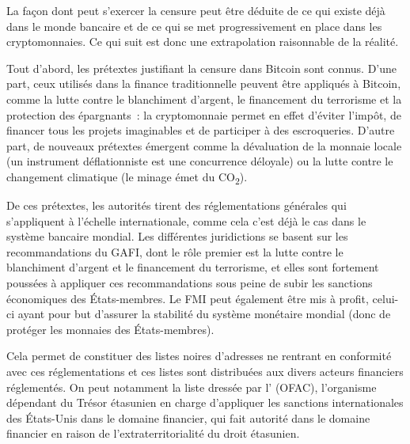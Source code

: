 La façon dont peut s'exercer la censure peut être déduite de ce qui existe déjà dans le monde bancaire et de ce qui se met progressivement en place dans les cryptomonnaies. Ce qui suit est donc une extrapolation raisonnable de la réalité.

Tout d'abord, les prétextes justifiant la censure dans Bitcoin sont connus. D'une part, ceux utilisés dans la finance traditionnelle peuvent être appliqués à Bitcoin, comme la lutte contre le blanchiment d'argent, le financement du terrorisme et la protection des épargnants~: la cryptomonnaie permet en effet d'éviter l'impôt, de financer tous les projets imaginables et de participer à des escroqueries. D'autre part, de nouveaux prétextes émergent comme la dévaluation de la monnaie locale (un instrument déflationniste est une concurrence déloyale) ou la lutte contre le changement climatique (le minage émet du CO\textsubscript{2}).

De ces prétextes, les autorités tirent des réglementations générales qui s'appliquent à l'échelle internationale, comme cela c'est déjà le cas dans le système bancaire mondial. Les différentes juridictions se basent sur les recommandations du GAFI, dont le rôle premier est la lutte contre le blanchiment d'argent et le financement du terrorisme, et elles sont fortement poussées à appliquer ces recommandations sous peine de subir les sanctions économiques des États-membres. Le FMI peut également être mis à profit, celui-ci ayant pour but d'assurer la stabilité du système monétaire mondial (donc de protéger les monnaies des États-membres).

Cela permet de constituer des listes noires d'adresses ne rentrant en conformité avec ces réglementations et ces listes sont distribuées aux divers acteurs financiers réglementés. On peut notamment la liste dressée par l' (OFAC), l'organisme dépendant du Trésor étasunien en charge d'appliquer les sanctions internationales des États-Unis dans le domaine financier, qui fait autorité dans le domaine financier en raison de l'extraterritorialité du droit étasunien.

